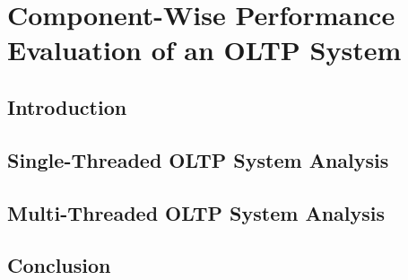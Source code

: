 \chapter[Component-Wise Performance Evaluation of an OLTP System]{Component-Wise Performance Evaluation of an OLTP System} \label{ch:looking_glass}

\section{Introduction} \label{sec:looking_glass_intro}

\section{Single-Threaded OLTP System Analysis} \label{sec:looking_glass_single-threaded}

\section{Multi-Threaded OLTP System Analysis} \label{sec:looking_glass_multi-threaded}

\section{Conclusion} \label{sec:looking_glass_outro}